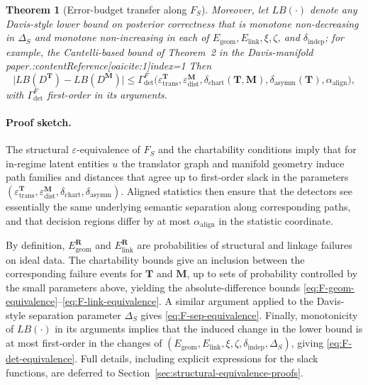 \documentclass[11pt]{article}
\newtheorem{theorem}{Theorem}
\begin{document}
\begin{theorem}[Error-budget transfer along $F_S$]
Moreover, let $LB(\cdot)$ denote any Davis-style lower bound on posterior
correctness that is monotone non-decreasing in $\Delta_S$ and monotone
non-increasing in each of $E_{\mathrm{geom}}, E_{\mathrm{link}}, \xi, \zeta$,
and $\delta_{\mathrm{indep}}$; for example, the Cantelli-based bound of
Theorem~2 in the Davis-manifold paper.:contentReference[oaicite:1]{index=1}  Then
\begin{equation}
\label{eq:F-det-equivalence}
\bigl|
  LB(D^{\mathbf{T}}) - LB(D^{\mathbf{M}})
\bigr|
\le
\Gamma^{F}_{\mathrm{det}}
  \bigl(
    \varepsilon_{\mathrm{trans}}^{\mathbf{T}},
    \varepsilon_{\mathrm{dist}}^{\mathbf{M}},
    \delta_{\mathrm{chart}}(\mathbf{T}, \mathbf{M}),
    \delta_{\mathrm{asymm}}(\mathbf{T}),
    \alpha_{\mathrm{align}}
  \bigr),
\end{equation}
with $\Gamma^{F}_{\mathrm{det}}$ first-order in its arguments.
\end{theorem}

\paragraph{Proof sketch.}
The structural $\varepsilon$-equivalence of $F_S$ and the chartability
conditions imply that for in-regime latent entities $u$ the translator
graph and manifold geometry induce path families and distances that agree
up to first-order slack in the parameters
$(\varepsilon_{\mathrm{trans}}^{\mathbf{T}},
\varepsilon_{\mathrm{dist}}^{\mathbf{M}}, \delta_{\mathrm{chart}},
\delta_{\mathrm{asymm}})$.  Aligned statistics then ensure that the
detectors see essentially the same underlying semantic separation along
corresponding paths, and that decision regions differ by at most
$\alpha_{\mathrm{align}}$ in the statistic coordinate.

By definition, $E_{\mathrm{geom}}^{\mathbf{R}}$ and
$E_{\mathrm{link}}^{\mathbf{R}}$ are probabilities of structural and
linkage failures on ideal data.  The chartability bounds give an
inclusion between the corresponding failure events for $\mathbf{T}$ and
$\mathbf{M}$, up to sets of probability controlled by the small
parameters above, yielding the absolute-difference bounds
\eqref{eq:F-geom-equivalence}–\eqref{eq:F-link-equivalence}.  A similar
argument applied to the Davis-style separation parameter $\Delta_S$ gives
\eqref{eq:F-sep-equivalence}.  Finally, monotonicity of $LB(\cdot)$ in
its arguments implies that the induced change in the lower bound is at
most first-order in the changes of
$(E_{\mathrm{geom}}, E_{\mathrm{link}}, \xi, \zeta, \delta_{\mathrm{indep}},
\Delta_S)$, giving \eqref{eq:F-det-equivalence}.  Full details, including
explicit expressions for the slack functions, are deferred to
Section~\ref{sec:structural-equivalence-proofs}.
\end{document}
